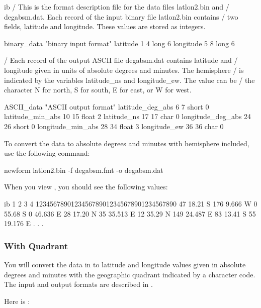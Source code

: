 \begin{vcode}{ib}
/ This is the format description file for the data files latlon2.bin and
/ degabsm.dat. Each record of the input binary file latlon2.bin contains 
/ two fields, latitude and longitude. These values are stored as integers.

binary_data "binary input format"
latitude 1 4 long 6
longitude 5 8 long 6

/ Each record of the output ASCII file degabsm.dat contains latitude and 
/ longitude given in units of absolute degrees and minutes. The hemisphere
/ is indicated by the variables latitude_ns and longitude_ew. The value can be
/ the character N for north, S for south, E for east, or W for west.

ASCII_data "ASCII output format"
latitude_deg_abs 6 7 short 0
latitude_min_abs 10 15 float 2
latitude_ns 17 17 char 0
longitude_deg_abs 24 26 short 0
longitude_min_abs 28 34 float 3
longitude_ew 36 36 char 0
\end{vcode}

To convert the data to absolute degrees and minutes with hemisphere included, use the following command:

\begin{example}
newform latlon2.bin -f degabsm.fmt -o degabsm.dat 
\end{example}

When you view , you should see the following values: 

\begin{vcode}{ib}
         1         2         3         4
1234567890123456789012345678901234567890
     47  18.21  S      176   9.666 W
      0  55.68  S        0  46.636 E
     28  17.20  N       35  35.513 E
     12  35.29  N      149  24.487 E
     83  13.41  S       55  19.176 E
              .
              .
              . 
\end{vcode}

\subsubsection{With Quadrant}

You will convert the data in  to latitude and longitude
values given in absolute degrees and minutes with the geographic
quadrant indicated by a character code. The input and output formats
are described in .

Here is :

